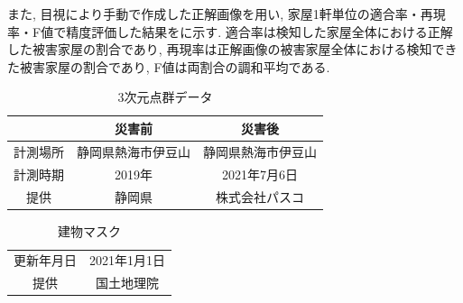\documentclass[a4paper, twocolumn, xelatex, 10pt, ja=standard, Ligatures=TeX]{bxjsarticle}
\begin{document}
		また, 目視により手動で作成した正解画像を用い, 家屋1軒単位の適合率・再現率・F値で精度評価した結果をに示す.
		適合率は検知した家屋全体における正解した被害家屋の割合であり, 再現率は正解画像の被害家屋全体における検知できた被害家屋の割合であり, 
		F値は両割合の調和平均である. 

		\begin{table}[H]
			\centering
			\caption{3次元点群データ}
			\label{table_tengun}
			\small
			\begin{tabular}{ccc}
				 & 災害前 & 災害後\\
				\hline
				計測場所 & 静岡県熱海市伊豆山 & 静岡県熱海市伊豆山\\
				計測時期 & 2019年 & 2021年7月6日\\
				提供 & 静岡県 & 株式会社パスコ\\
				\hline
			\end{tabular}
		\end{table}
		\begin{table}[H]
			\centering
			\caption{建物マスク}
			\label{table_mask}
			\small
			\begin{tabular}{cc}
				\hline
				更新年月日 & 2021年1月1日\\
				提供 & 国土地理院\\
				\hline
			\end{tabular}
		\end{table}
\end{document}
